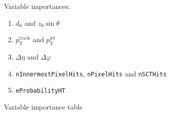 Variable importances:
\begin{enumerate}
\item $d_0$ and $z_0 \sin\theta$
\item $p_\text{T}^\text{track}$ and $p_\text{T}^\text{jet}$
\item $\Delta \eta$ and $\Delta \varphi$
\item \texttt{nInnermostPixelHits}, \texttt{nPixelHits} and \texttt{nSCTHits}
\item \texttt{eProbabilityHT}
\end{enumerate}

\begin{table}[ht]
  \centering
  {\small}
  \caption{Variable importance table}
\end{table}


